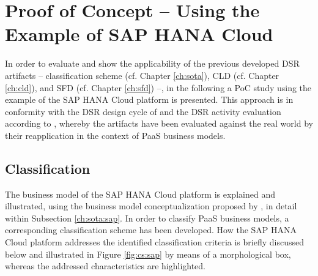 \chapter{Proof of Concept -- Using the Example of SAP HANA Cloud}\label{ch:poc}

In order to evaluate and show the applicability of the previous developed \ac{DSR} artifacts -- classification scheme (cf. Chapter \ref{ch:sota}), \ac{CLD} (cf. Chapter \ref{ch:cld}), and \ac{SFD} (cf. Chapter \ref{ch:sfd}) --, in the following a \acf{PoC} study using the example of the SAP HANA Cloud platform is presented. This approach is in conformity with the \ac{DSR} design cycle of \citet[pp. 88,90-91]{Hevner2007} and the \ac{DSR} activity evaluation according to \citet[p. 56]{Peffers2007}, whereby the artifacts have been evaluated against the real world by their reapplication in the context of \ac{PaaS} business models.

\section{Classification}\label{ch:poc:cs}

The business model of the SAP HANA Cloud platform is explained and illustrated, using the business model conceptualization proposed by \citet{Johnson2008}, in detail within Subsection \ref{ch:sota:sap}. In order to classify \ac{PaaS} business models, a corresponding classification scheme has been developed. How the SAP HANA Cloud platform addresses the identified classification criteria is briefly discussed below and illustrated in Figure \ref{fig:cs:sap} by means of a morphological box, whereas the addressed characteristics are highlighted.

